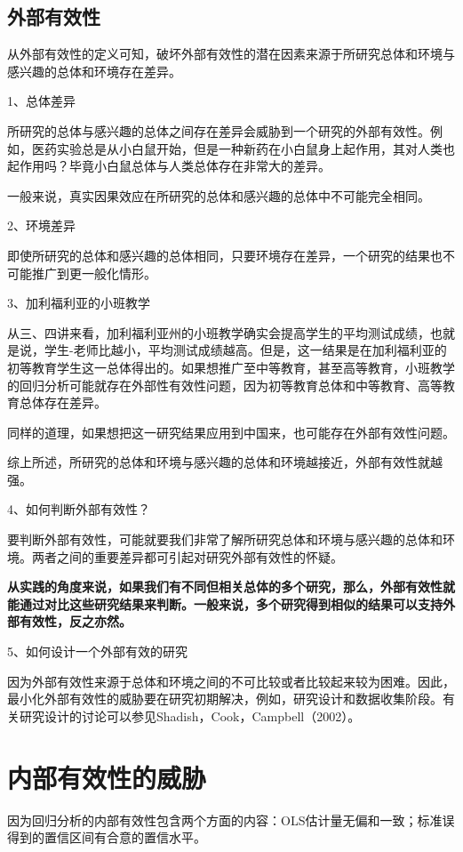 \documentclass[cn,10pt,math=newtx,citestyle=gb7714-2015,bibstyle=gb7714-2015]{elegantbook}
\begin{document}
\subsection{外部有效性}
从外部有效性的定义可知，破坏外部有效性的潜在因素来源于所研究总体和环境与感兴趣的总体和环境存在差异。

1、总体差异

所研究的总体与感兴趣的总体之间存在差异会威胁到一个研究的外部有效性。例如，医药实验总是从小白鼠开始，但是一种新药在小白鼠身上起作用，其对人类也起作用吗？毕竟小白鼠总体与人类总体存在非常大的差异。

一般来说，真实因果效应在所研究的总体和感兴趣的总体中不可能完全相同。

2、环境差异

即使所研究的总体和感兴趣的总体相同，只要环境存在差异，一个研究的结果也不可能推广到更一般化情形。

3、加利福利亚的小班教学

从三、四讲来看，加利福利亚州的小班教学确实会提高学生的平均测试成绩，也就是说，学生-老师比越小，平均测试成绩越高。但是，这一结果是在加利福利亚的初等教育学生这一总体得出的。如果想推广至中等教育，甚至高等教育，小班教学的回归分析可能就存在外部性有效性问题，因为初等教育总体和中等教育、高等教育总体存在差异。

同样的道理，如果想把这一研究结果应用到中国来，也可能存在外部有效性问题。

综上所述，所研究的总体和环境与感兴趣的总体和环境越接近，外部有效性就越强。

4、如何判断外部有效性？

要判断外部有效性，可能就要我们非常了解所研究总体和环境与感兴趣的总体和环境。两者之间的重要差异都可引起对研究外部有效性的怀疑。

\textbf{从实践的角度来说，如果我们有不同但相关总体的多个研究，那么，外部有效性就能通过对比这些研究结果来判断。一般来说，多个研究得到相似的结果可以支持外部有效性，反之亦然。}

5、如何设计一个外部有效的研究

因为外部有效性来源于总体和环境之间的不可比较或者比较起来较为困难。因此，最小化外部有效性的威胁要在研究初期解决，例如，研究设计和数据收集阶段。有关研究设计的讨论可以参见Shadish，Cook，Campbell（2002）。

\section{内部有效性的威胁}
因为回归分析的内部有效性包含两个方面的内容：OLS估计量无偏和一致；标准误得到的置信区间有合意的置信水平。
\end{document}
